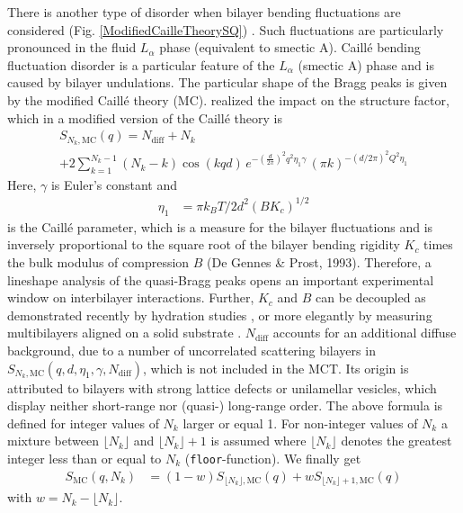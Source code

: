 There is another type of disorder when bilayer bending fluctuations
are considered (Fig. \ref{ModifiedCailleTheorySQ}) \cite{Pabst2003,Fruhwirth2004}. Such
fluctuations are particularly pronounced in the fluid $L_\alpha$
phase (equivalent to smectic A). Caill\'e bending fluctuation
disorder is a particular feature of the $L_\alpha$ (smectic A) phase
and is caused by bilayer undulations. The particular shape of the
Bragg peaks is given by the modified Caill\'e theory (MC).
\cite{Caille1972} realized the impact on the structure factor, which
in a modified version \cite{Zhang1994} of the Caill\'e theory
is
\begin{multline} \label{eq:MCMonoSum}
S_{N_k,\mathrm{MC}}(q) = N_\mathrm{diff}+ N_k \\
                        + 2 \sum_{k=1}^{N_k-1} (N_k-k) \cos(kqd) \,
                            e^{ -\left(\frac{d}{2\pi}\right)^2 q^2 \eta_1 \gamma }
                             \, (\pi k)^{-(d/2\pi)^2Q^2\eta_1}
\end{multline}
Here, $\gamma$ is Euler's constant and
\begin{align}
 \eta_1& = \pi k_B T / 2d^2(BK_c)^{1/2}
\end{align}
is the Caill\'e parameter, which is a measure for the bilayer
fluctuations and is inversely proportional to the square root of the
bilayer bending rigidity $K_c$ times the bulk modulus of compression
$B$ (De Gennes \& Prost, 1993). Therefore, a lineshape analysis of
the quasi-Bragg peaks opens an important experimental window on
interbilayer interactions. Further, $K_c$ and $B$ can be decoupled
as demonstrated recently by hydration studies
\cite{Petrache1998,Pabst2003}, or more elegantly by measuring
multibilayers aligned on a solid substrate \cite{Lyatskaya2000}.
$N_\text{diff}$ accounts for an additional diffuse background, due
to a number of uncorrelated scattering bilayers in
$S_{N_k,\mathrm{MC}}(q,d,\eta_1,\gamma, N_\text{diff}) $, which is not
included in the MCT. Its origin is attributed to bilayers with
strong lattice defects or unilamellar vesicles, which display
neither short-range nor (quasi-) long-range order.
The above formula is defined for integer values of $N_k$ larger or equal 1. For non-integer values of $N_k$ a mixture between $\lfloor N_k\rfloor$ and $\lfloor N_k\rfloor+1$ is assumed where $\lfloor N_k \rfloor$ denotes the greatest integer less than or equal to $N_k$ (\texttt{\texttt{floor}}-function). We finally get
\begin{align} \label{eq:continuesSQMC}
S_\mathrm{MC}(q,N_k) &= (1-w)S_{\lfloor N_k\rfloor,\mathrm{MC}}(q) + w S_{\lfloor N_k\rfloor+1,\mathrm{MC}}(q)
\end{align}
with $w=N_k-\lfloor N_k\rfloor$.

